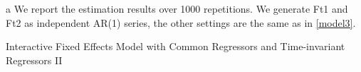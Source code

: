 \documentclass[a4paper]{article}
\begin{document}
\begin{table}[]
\begin{threeparttable}
\begin{tablenotes}
        \footnotesize
        \item[a]  We report the estimation results over 1000 repetitions. We generate Ft1 and Ft2 as independent AR(1) series,
        the other settings are the same as in  \eqref{model3}.
      \end{tablenotes}
\end{threeparttable}

\end{table}


\begin{table}[]
\centering
\caption{ \centering Interactive Fixed Effects Model with Common Regressors and Time-invariant Regressors II}
\label{table:table9}

\begin{threeparttable}


\end{threeparttable}
\end{table}
\end{document}
